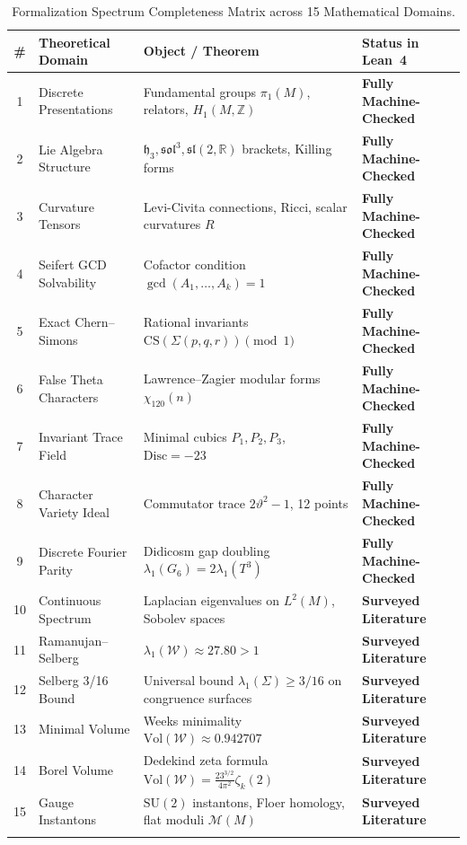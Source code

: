 \documentclass[11pt,a4paper]{article}
\begin{document}
\begin{longtable}{@{}clll@{}}
\toprule
\textbf{\#} & \textbf{Theoretical Domain} & \textbf{Object / Theorem} & \textbf{Status in Lean~4} \\
\midrule
\endhead
1 & Discrete Presentations & Fundamental groups $\pi_1(M)$, relators, $H_1(M, \mathbb{Z})$ & \textbf{Fully Machine-Checked} \\
2 & Lie Algebra Structure & $\mathfrak{h}_3, \mathfrak{sol}^3, \mathfrak{sl}(2, \mathbb{R})$ brackets, Killing forms & \textbf{Fully Machine-Checked} \\
3 & Curvature Tensors & Levi-Civita connections, Ricci, scalar curvatures $R$ & \textbf{Fully Machine-Checked} \\
4 & Seifert GCD Solvability & Cofactor condition $\gcd(A_1, \dots, A_k) = 1$ & \textbf{Fully Machine-Checked} \\
5 & Exact Chern--Simons & Rational invariants $\mathrm{CS}(\Sigma(p,q,r)) \pmod 1$ & \textbf{Fully Machine-Checked} \\
6 & False Theta Characters & Lawrence--Zagier modular forms $\chi_{120}(n)$ & \textbf{Fully Machine-Checked} \\
7 & Invariant Trace Field & Minimal cubics $P_1, P_2, P_3$, $\mathrm{Disc} = -23$ & \textbf{Fully Machine-Checked} \\
8 & Character Variety Ideal & Commutator trace $2\vartheta^2-1$, 12 points & \textbf{Fully Machine-Checked} \\
9 & Discrete Fourier Parity & Didicosm gap doubling $\lambda_1(G_6) = 2\lambda_1(T^3)$ & \textbf{Fully Machine-Checked} \\
10 & Continuous Spectrum & Laplacian eigenvalues on $L^2(M)$, Sobolev spaces & \textbf{Surveyed Literature} \\
11 & Ramanujan--Selberg & $\lambda_1(\mathcal{W}) \approx 27.80 > 1$ & \textbf{Surveyed Literature} \\
12 & Selberg 3/16 Bound & Universal bound $\lambda_1(\Sigma) \ge 3/16$ on congruence surfaces & \textbf{Surveyed Literature} \\
13 & Minimal Volume & Weeks minimality $\mathrm{Vol}(\mathcal{W}) \approx 0.942707$ & \textbf{Surveyed Literature} \\
14 & Borel Volume & Dedekind zeta formula $\mathrm{Vol}(\mathcal{W}) = \frac{23^{3/2}}{4\pi^2}\zeta_k(2)$ & \textbf{Surveyed Literature} \\
15 & Gauge Instantons & $\mathrm{SU}(2)$ instantons, Floer homology, flat moduli $\mathcal{M}(M)$ & \textbf{Surveyed Literature} \\
\bottomrule
\caption{Formalization Spectrum Completeness Matrix across 15 Mathematical Domains.}
\label{tab:spectrum}
\end{longtable}
\end{document}
